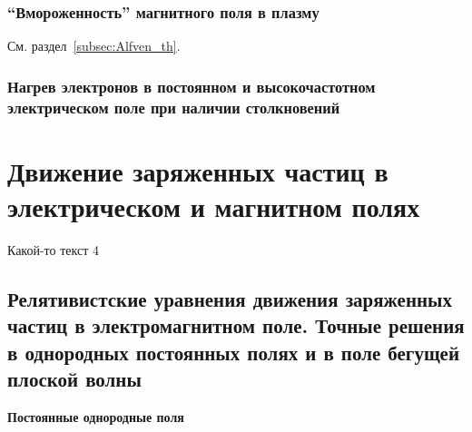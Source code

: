 \documentclass[10pt, a4paper]{article}
\let\stdsection\section
\renewcommand\section{\newpage\stdsection}
\begin{document}
\subsubsection{ ``Вмороженность'' магнитного поля в плазму}

См. раздел~\ref{subsec:Alfven_th}.

\subsubsection{Нагрев электронов в постоянном и высокочастотном электрическом поле при наличии столкновений}

\section{Движение заряженных частиц в электрическом и магнитном полях}

Какой-то текст 4

\subsection{Релятивистские уравнения движения заряженных частиц в электромагнитном поле. Точные решения в однородных постоянных полях и в поле бегущей плоской волны}

\textbf{Постоянные однородные поля}
\end{document}

